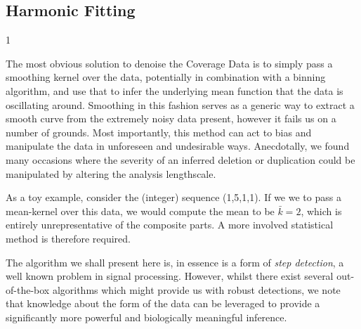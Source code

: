 \documentclass[fleqn,usenatbib]{mnras}
\def\commentVisible{1}
\newcommand\comment[1]
{
	{
		\if\commentVisible1
			\color{red!70!black}
		\else
			\color{black}
		\fi

		#1
	}
}
\begin{document}
		\subsection{Harmonic Fitting}
			\comment{
			{The most obvious solution to denoise the Coverage Data is to simply pass a smoothing kernel over the data, potentially in combination with a binning algorithm, and use that to infer the underlying mean function that the data is oscillating around. Smoothing in this fashion serves as a generic way to extract a smooth curve from the extremely noisy data present, however it fails us on a number of grounds. Most importantly, this method can act to bias and manipulate the data in unforeseen and undesirable ways. Anecdotally, we found many occasions where the severity of an inferred deletion or duplication could be manipulated by altering the analysis lengthscale. }
			
			As a toy example, consider the (integer) sequence (1,5,1,1). If we we to pass a mean-kernel over this data, we would compute the mean to be $\bar{k}=2$, which is entirely unrepresentative of the composite parts.  A more involved statistical method is therefore required.
			
			The algorithm we shall present here is, in essence is a form of \textit{step detection}, a well known problem in signal processing. However, whilst there exist several out-of-the-box algorithms which might provide us with robust detections, we note that knowledge about the form of the data can be leveraged to provide a significantly more powerful and biologically meaningful inference. 
			}
			

	
\end{document}
